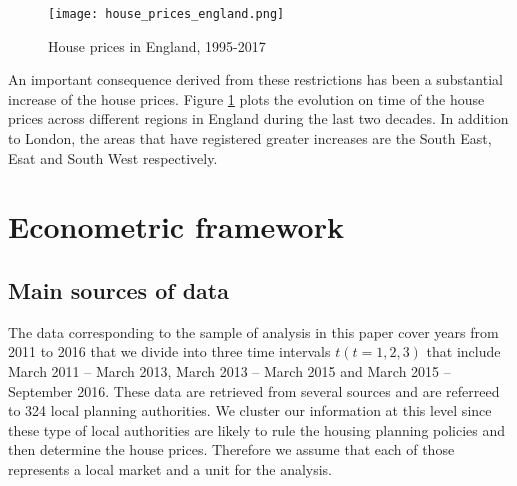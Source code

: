 \documentclass[12pt,letterpaper]{article}
\begin{document}
     
     
\begin{figure}[h!]
\texttt{[image: house\_prices\_england.png]}
\caption{House prices in England, 1995-2017}
\label{fig: house_prices}
\end{figure}

 An important consequence derived from these restrictions has been a substantial 
                  increase of the house prices. Figure \ref{fig: house_prices} 
     plots the evolution on time of the house prices across different regions in 
     England during the last two decades. In addition to London, the areas that 
     have registered greater increases are the South East, Esat and South West 
     respectively. 
  
  \section{Econometric framework}
  
  \subsection*{Main sources of data}
  
  
The data corresponding to  the sample of analysis in this paper cover years from 2011 to 2016 
  that we divide into three time intervals $t  (t = 1, 2, 3)$ that include March 2011 – March 2013, 
  March 2013 – March 2015 and March 2015 – September 2016. These data are 
  retrieved from several sources and are referreed to 324 local planning 
  authorities. We cluster our information at this level since these type of local authorities are likely to rule the housing planning policies and then 
  determine the house prices. Therefore we assume that each of those represents a local market and
  a unit for the analysis. 
  
\end{document}
